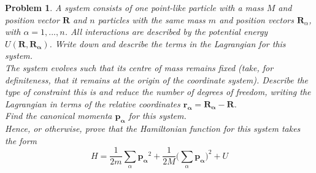 \documentclass[a4paper]{article}
\theoremstyle{new}
\newtheorem{qns}{Problem}[section]
\begin{document}
\begin{qns}
A system consists of one point-like particle with a mass $M$ and position vector $\mathbf{R}$ and $n$ particles with the same mass $m$ and position vectors $\mathbf{R}_\alpha$, with $\alpha= 1,..., n$. All interactions are described by the potential energy $U(\mathbf{R},\mathbf{R_\alpha})$. Write down and describe the terms in the Lagrangian for this system.\\[5pt]
The system evolves such that its centre of mass remains fixed (take, for definiteness, that it remains at the origin of the coordinate system). Describe the type of constraint this is and reduce the number of degrees of freedom, writing the Lagrangian in terms of the relative coordinates $\mathbf{r_\alpha}=\mathbf{R_\alpha}-\mathbf{R}$.\\[5pt]
Find the canonical momenta $\mathbf{p_\alpha}$ for this system.\\[5pt]
Hence, or otherwise, prove that the Hamiltonian function for this system takes the form
$$H=\frac{1}{2m}\sum_\alpha\mathbf{p_\alpha}^2+\frac{1}{2M}\bigg(\sum_\alpha\mathbf{p_\alpha}\bigg)^2+U$$
\end{qns}
\end{document}
